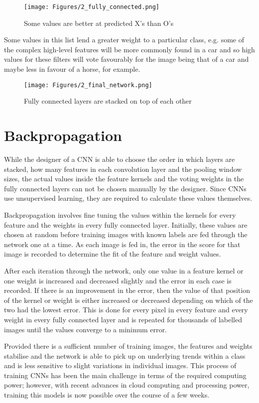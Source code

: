 \begin{figure}[!ht]
\centering
\texttt{[image: Figures/2\_fully\_connected.png]}
\decoRule
\caption[Fully Connected Layer]{Some values are better at predicted X's than O's \parencite{convolution2}}
\label{fig:2:fullyconnected}
\end{figure}

Some values in this list lend a greater weight to a particular class, e.g. some of the complex high-level features will be more commonly found in a car and so high values for these filters will vote favourably for the image being that of a car and maybe less in favour of a horse, for example.

\begin{figure}[!ht]
\centering
\texttt{[image: Figures/2\_final\_network.png]}
\decoRule
\caption[Convolutional Neural Network]{Fully connected layers are stacked on top of each other \parencite{convolution2}}
\label{fig:2:finalnetwork}
\end{figure}

\section*{Backpropagation}
While the designer of a CNN is able to choose the order in which layers are stacked, how many features in each convolution layer and the pooling window sizes, the actual values inside the feature kernels and the voting weights in the fully connected layers can not be chosen manually by the designer. Since CNNs use unsupervised learning, they are required to calculate these values themselves.

Backpropagation involves fine tuning the values within the kernels for every feature and the weights in every fully connected layer. Initially, these values are chosen at random before training images with known labels are fed through the network one at a time. As each image is fed in, the error in the score for that image is recorded to determine the fit of the feature and weight values.

After each iteration through the network, only one value in a feature kernel or one weight is increased and decreased slightly and the error in each case is recorded. If there is an improvement in the error, then the value of that position of the kernel or weight is either increased or decreased depending on which of the two had the lowest error. This is done for every pixel in every feature and every weight in every fully connected layer and is repeated for thousands of labelled images until the values converge to a minimum error.

Provided there is a sufficient number of training images, the features and weights stabilise and the network is able to pick up on underlying trends within a class and is less sensitive to slight variations in individual images. This process of training CNNs has been the main challenge in terms of the required computing power; however, with recent advances in cloud computing and processing power, training this models is now possible over the course of a few weeks. \parencite{convolution2}
